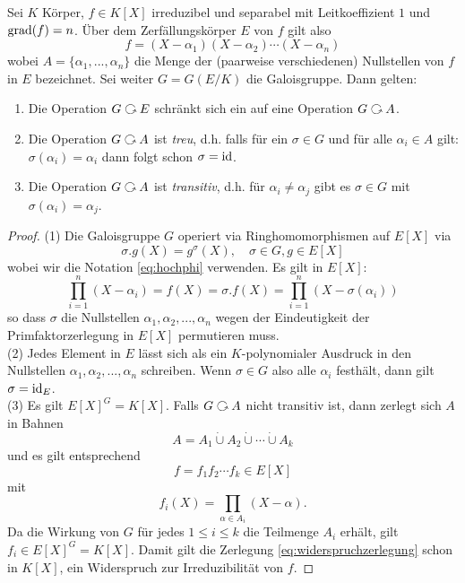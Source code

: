 \documentclass{book}
\begin{document}
\begin{thm}
    \label{thm:galop}
        Sei $K$ Körper, $f \in K[X]$ irreduzibel und separabel mit Leitkoeffizient $1$ und $\operatorname{grad}(f)
        = n$. Über dem Zerfällungskörper $E$ von $f$ gilt also
        \[
            f = (X-\alpha_1)(X-\alpha_2)\cdots (X-\alpha_n)
        \]
        wobei $A = \{ \alpha_1, ..., \alpha_n \}$ die Menge der (paarweise
        verschiedenen) Nullstellen von $f$ in $E$ bezeichnet. Sei weiter $G =
        G(E/K)$ die Galoisgruppe. Dann gelten:
        \begin{enumerate}
            \item Die Operation $G \actson E$ schränkt sich ein auf eine Operation $G \actson A$. 
            \item {}Die Operation $G \actson A$ ist \emph{treu}, d.h. falls für
                ein $\sigma \in G$ und für alle $\alpha_i \in A$ gilt:
                $\sigma(\alpha_i) = \alpha_i$ dann folgt schon $\sigma = \operatorname{id}$. 
            \item Die Operation $G \actson A$ ist \emph{transitiv}, d.h. für
                $\alpha_i \neq \alpha_j$ gibt es $\sigma \in G$ mit
                $\sigma(\alpha_i) = \alpha_j$.
        \end{enumerate}
\end{thm}
\begin{proof}
    (1) Die Galoisgruppe $G$ operiert via Ringhomomorphismen auf $E[X]$ via 
    \[
        \sigma.g(X) = g^{\sigma}(X), \quad \sigma \in G, g \in E[X]
    \]
    wobei wir die Notation \ref{eq:hochphi} verwenden. Es gilt in $E[X]$:
    \[
        \prod_{i=1}^n (X - \alpha_i) = f(X) = \sigma.f(X) = \prod_{i=1}^n (X - \sigma(\alpha_i))
    \]
    so dass $\sigma$ die Nullstellen $\alpha_1, \alpha_2, ..., \alpha_n$ wegen
    der Eindeutigkeit der Primfaktorzerlegung in $E[X]$ permutieren muss.\\

    \noindent
    (2) Jedes Element in $E$ lässt sich als ein $K$-polynomialer Ausdruck in
    den Nullstellen $\alpha_1, \alpha_2, ..., \alpha_n$ schreiben. Wenn $\sigma
    \in G$ also alle $\alpha_i$ festhält, dann gilt $\sigma = \operatorname{id}_E$.\\

    \noindent
    (3) Es gilt $E[X]^G = K[X]$. Falls $G \actson A$ nicht transitiv ist, dann
    zerlegt sich $A$ in Bahnen
    \[
        A = A_1 \dot{\cup} A_2 \dot{\cup} \cdots \dot{\cup} A_k
    \]
    und es gilt entsprechend
    \begin{equation}
        \label{eq:widerspruchzerlegung}
        f = f_1 f_2 \cdots f_k \in E[X]
    \end{equation}
    mit 
    \[
        f_i(X) = \prod_{\alpha \in A_i} (X - \alpha).
    \]
    Da die Wirkung von $G$ für jedes $1 \le i \le k$ die Teilmenge $A_i$
    erhält, gilt $f_i \in E[X]^G = K[X]$. Damit gilt die Zerlegung
    \eqref{eq:widerspruchzerlegung} schon in $K[X]$, ein Widerspruch zur
    Irreduzibilität von $f$. 
\end{proof}
\end{document}
